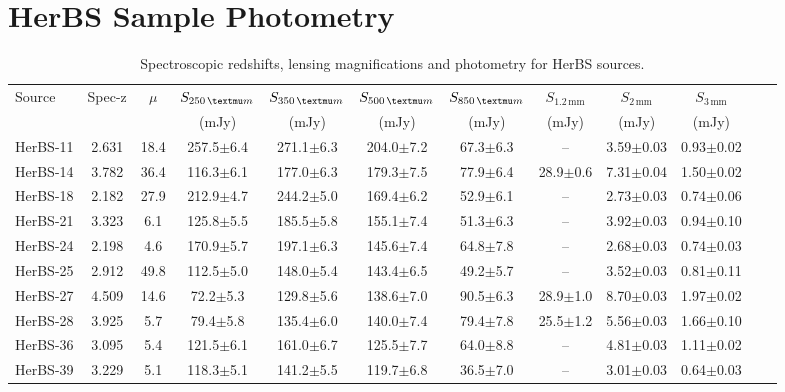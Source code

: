 \chapter{HerBS Sample Photometry}

\begin{landscape}
\begin{longtable}{lccccccccccr}

	\caption[Photometry for the HerBS sub-sample]{Spectroscopic redshifts, lensing magnifications and photometry for HerBS sources.}
	\label{tab:data_herbs} \\
	\hline
	\hline
	Source & Spec-z & $\mu$ & $S_{250\,\micron}$ & $S_{350\,\micron}$ & $S_{500\,\micron}$ & $S_{850\,\micron}$ & $S_{1.2\,\textrm{mm}}$ & $S_{2\,\textrm{mm}}$ & $S_{3\,\textrm{mm}}$ \\
    & & & (mJy) & (mJy) & (mJy) & (mJy) & (mJy) & (mJy) & (mJy) \\
	\hline
    \hline
	HerBS-11 & 2.631 & 18.4 & 257.5$\pm$6.4 & 271.1$\pm$6.3 & 204.0$\pm$7.2 & 67.3$\pm$6.3 & -- & 3.59$\pm$0.03 & 0.93$\pm$0.02\\
	HerBS-14 & 3.782 & 36.4 & 116.3$\pm$6.1 & 177.0$\pm$6.3 & 179.3$\pm$7.5 & 77.9$\pm$6.4 & 28.9$\pm$0.6 & 7.31$\pm$0.04 & 1.50$\pm$0.02\\
	HerBS-18 & 2.182 & 27.9 & 212.9$\pm$4.7 & 244.2$\pm$5.0 & 169.4$\pm$6.2 & 52.9$\pm$6.1 & -- & 2.73$\pm$0.03 & 0.74$\pm$0.06\\
	HerBS-21 & 3.323 & 6.1 & 125.8$\pm$5.5 & 185.5$\pm$5.8 & 155.1$\pm$7.4 & 51.3$\pm$6.3 & -- & 3.92$\pm$0.03 & 0.94$\pm$0.10\\
	HerBS-24 & 2.198 & 4.6 & 170.9$\pm$5.7 & 197.1$\pm$6.3 & 145.6$\pm$7.4 & 64.8$\pm$7.8 & -- & 2.68$\pm$0.03 & 0.74$\pm$0.03\\
	HerBS-25 & 2.912 & 49.8 & 112.5$\pm$5.0 & 148.0$\pm$5.4 & 143.4$\pm$6.5 & 49.2$\pm$5.7 & -- & 3.52$\pm$0.03 & 0.81$\pm$0.11\\
	HerBS-27 & 4.509 & 14.6 & 72.2$\pm$5.3 & 129.8$\pm$5.6 & 138.6$\pm$7.0 & 90.5$\pm$6.3 & 28.9$\pm$1.0 & 8.70$\pm$0.03 & 1.97$\pm$0.02\\
	HerBS-28 & 3.925 & 5.7 & 79.4$\pm$5.8 & 135.4$\pm$6.0 & 140.0$\pm$7.4 & 79.4$\pm$7.8 & 25.5$\pm$1.2 & 5.56$\pm$0.03 & 1.66$\pm$0.10\\
	HerBS-36 & 3.095 & 5.4 & 121.5$\pm$6.1 & 161.0$\pm$6.7 & 125.5$\pm$7.7 & 64.0$\pm$8.8 & -- & 4.81$\pm$0.03 & 1.11$\pm$0.02\\
	HerBS-39 & 3.229 & 5.1 & 118.3$\pm$5.1 & 141.2$\pm$5.5 & 119.7$\pm$6.8 & 36.5$\pm$7.0 & -- & 3.01$\pm$0.03 & 0.64$\pm$0.03\\

\end{longtable}
\end{landscape}
